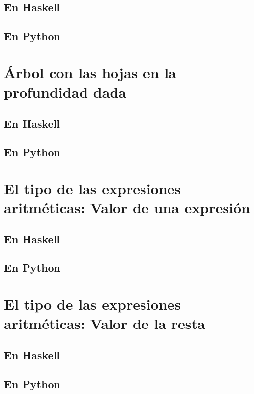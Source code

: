 \documentclass[a4paper,12pt,twoside]{book}
\begin{document}
\subsection*{En Haskell}
\subsection*{En Python}

\section{Árbol con las hojas en la profundidad dada}
\subsection*{En Haskell}
\subsection*{En Python}

\section{El tipo de las expresiones aritméticas: Valor de una expresión}
\subsection*{En Haskell}
\subsection*{En Python}

\section{El tipo de las expresiones aritméticas: Valor de la resta}
\subsection*{En Haskell}
\subsection*{En Python}
\end{document}
